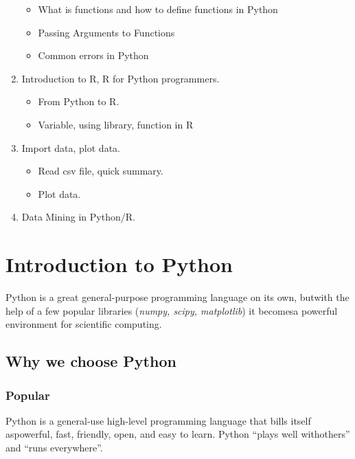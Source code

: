 \documentclass[11pt]{article}
\providecommand{\tightlist}{%
      \setlength{\itemsep}{0pt}\setlength{\parskip}{0pt}}
\begin{document}
\begin{enumerate}
  \begin{itemize}
  \tightlist
  \item
    What is functions and how to define functions in Python
  \item
    Passing Arguments to Functions
  \item
    Common errors in Python
  \end{itemize}
\item
  Introduction to R, R for Python programmers.

  \begin{itemize}
  \tightlist
  \item
    From Python to R.
  \item
    Variable, using library, function in R
  \end{itemize}
\item
  Import data, plot data.

  \begin{itemize}
  \tightlist
  \item
    Read csv file, quick summary.
  \item
    Plot data.
  \end{itemize}
\item
  Data Mining in Python/R.
\end{enumerate}

    \section{Introduction to Python}\label{introduction-to-python}

Python is a great general-purpose programming language on its own,
butwith the help of a few popular libraries (\emph{numpy, scipy,
matplotlib}) it becomesa powerful environment for scientific computing.

\subsection{Why we choose Python}\label{why-we-choose-python}

\subsubsection{Popular}\label{popular}

Python is a general-use high-level programming language that bills
itself aspowerful, fast, friendly, open, and easy to learn. Python
``plays well withothers'' and ``runs everywhere''.
\end{document}

